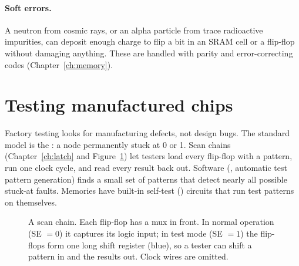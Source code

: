 \paragraph{Soft errors.} A neutron from cosmic rays, or an alpha particle from trace radioactive impurities, can deposit enough charge to flip a bit in an SRAM cell or a flip-flop without damaging anything. These  are handled with parity and error-correcting codes (Chapter~\ref{ch:memory}).

\section{Testing manufactured chips}

Factory testing looks for manufacturing defects, not design bugs. The standard model is the : a node permanently stuck at 0 or 1. Scan chains (Chapter~\ref{ch:latch} and Figure~\ref{fig:scanchain}) let testers load every flip-flop with a pattern, run one clock cycle, and read every result back out. Software (, automatic test pattern generation) finds a small set of patterns that detect nearly all possible stuck-at faults. Memories have built-in self-test () circuits that run test patterns on themselves.

\begin{figure}[h]
\centering
{}
\caption{A scan chain. Each flip-flop has a mux in front. In normal operation (SE $= 0$) it captures its logic input; in test mode (SE $= 1$) the flip-flops form one long shift register (blue), so a tester can shift a pattern in and the results out. Clock wires are omitted.}
\label{fig:scanchain}
\end{figure}


